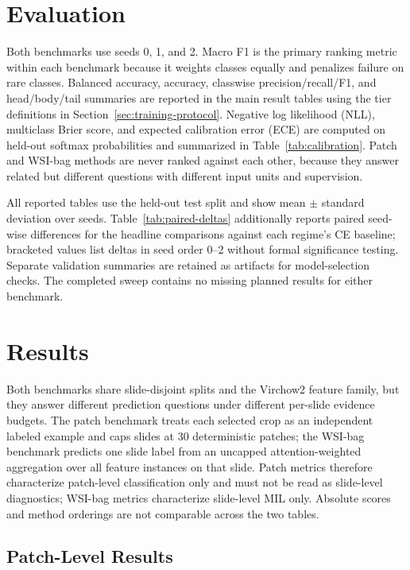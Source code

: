 \documentclass[11pt]{article}
\begin{document}
\section{Evaluation}
Both benchmarks use seeds 0, 1, and 2. Macro F1 is the primary ranking metric within each benchmark because it weights classes equally and penalizes failure on rare classes. Balanced accuracy, accuracy, classwise precision/recall/F1, and head/body/tail summaries are reported in the main result tables using the tier definitions in Section~\ref{sec:training-protocol}. Negative log likelihood (NLL), multiclass Brier score, and expected calibration error (ECE) are computed on held-out softmax probabilities and summarized in Table~\ref{tab:calibration}. Patch and WSI-bag methods are never ranked against each other, because they answer related but different questions with different input units and supervision.

All reported tables use the held-out test split and show mean $\pm$ standard deviation over seeds. Table~\ref{tab:paired-deltas} additionally reports paired seed-wise differences for the headline comparisons against each regime's CE baseline; bracketed values list deltas in seed order 0--2 without formal significance testing. Separate validation summaries are retained as artifacts for model-selection checks. The completed sweep contains no missing planned results for either benchmark.

\section{Results}
Both benchmarks share slide-disjoint splits and the Virchow2 feature family, but they answer different prediction questions under different per-slide evidence budgets. The patch benchmark treats each selected crop as an independent labeled example and caps slides at 30 deterministic patches; the WSI-bag benchmark predicts one slide label from an uncapped attention-weighted aggregation over all feature instances on that slide. Patch metrics therefore characterize patch-level classification only and must not be read as slide-level diagnostics; WSI-bag metrics characterize slide-level MIL only. Absolute scores and method orderings are not comparable across the two tables.

\subsection{Patch-Level Results}
\begin{table}[ht]
  \centering
  \caption{Patch-level test results over three seeds. Methods share the same controlled manifest, frozen Virchow2 encoder, linear classifier head, and evaluation code.}
  \label{tab:patch-results}
  \small
  
\end{table}
\end{document}
